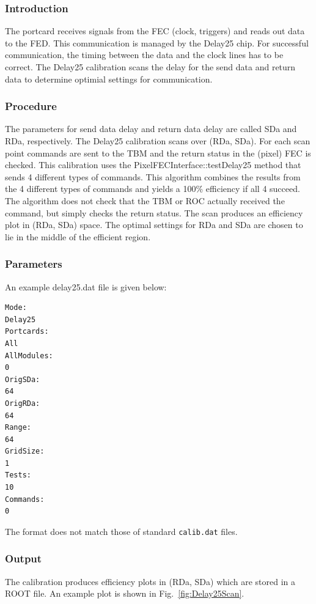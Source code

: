 \subsubsection{Introduction}
The portcard receives signals from the FEC (clock, triggers) and reads out data to the FED.  This communication is managed by the Delay25 chip. For successful communication, the timing between the data and the clock lines has to be correct.  The Delay25 calibration scans the delay for the send data and return data to determine optimial settings for communication.

\subsubsection{Procedure}
The parameters for send data delay and return data delay are called SDa and RDa, respectively.  The Delay25 calibration scans over (RDa, SDa).  For each scan point commands are sent to the TBM and the return status in the (pixel) FEC is checked. This calibration uses the PixelFECInterface::testDelay25 method that sends 4 different types of commands. This algorithm combines the results from the 4 different types of commands and yields a 100\% efficiency if all 4 succeed. The algorithm does not check that the TBM or ROC actually received the command, but simply checks the return status. The scan produces an efficiency plot in (RDa, SDa) space.  The optimal settings for RDa and SDa are chosen to lie in the middle of the efficient region. 

\subsubsection{Parameters}
An example delay25.dat file is given below:
\begin{verbatim}
Mode:
Delay25
Portcards:
All
AllModules:
0
OrigSDa:
64
OrigRDa:
64
Range:
64
GridSize:
1
Tests:
10
Commands:
0
\end{verbatim}
The format does not match those of standard \verb|calib.dat| files.

\subsubsection{Output}
The calibration produces efficiency plots in (RDa, SDa) which are stored in a ROOT file. An example plot is shown in Fig.~\ref{fig:Delay25Scan}.

